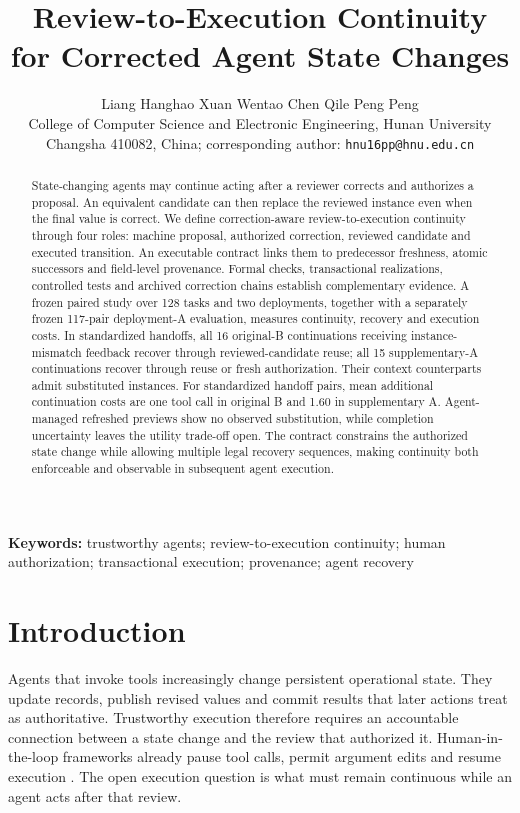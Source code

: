 \documentclass[10pt,a4paper,twocolumn]{article}
\title{Review-to-Execution Continuity for Corrected Agent State Changes}
\author{Liang Hanghao \quad Xuan Wentao \quad Chen Qile \quad Peng Peng\\
\small College of Computer Science and Electronic Engineering, Hunan University\\
\small Changsha 410082, China; corresponding author: \texttt{hnu16pp@hnu.edu.cn}}
\date{}
\begin{document}
\maketitle
\begin{abstract}
State-changing agents may continue acting after a reviewer corrects and authorizes a proposal. An equivalent candidate can then replace the reviewed instance even when the final value is correct. We define correction-aware review-to-execution continuity through four roles: machine proposal, authorized correction, reviewed candidate and executed transition. An executable contract links them to predecessor freshness, atomic successors and field-level provenance. Formal checks, transactional realizations, controlled tests and archived correction chains establish complementary evidence. A frozen paired study over 128 tasks and two deployments, together with a separately frozen 117-pair deployment-A evaluation, measures continuity, recovery and execution costs. In standardized handoffs, all 16 original-B continuations receiving instance-mismatch feedback recover through reviewed-candidate reuse; all 15 supplementary-A continuations recover through reuse or fresh authorization. Their context counterparts admit substituted instances. For standardized handoff pairs, mean additional continuation costs are one tool call in original B and 1.60 in supplementary A. Agent-managed refreshed previews show no observed substitution, while completion uncertainty leaves the utility trade-off open. The contract constrains the authorized state change while allowing multiple legal recovery sequences, making continuity both enforceable and observable in subsequent agent execution.
\end{abstract}
\noindent\textbf{Keywords:} trustworthy agents; review-to-execution continuity; human authorization; transactional execution; provenance; agent recovery

\section{Introduction}
Agents that invoke tools increasingly change persistent operational state. They update records, publish revised values and commit results that later actions treat as authoritative. Trustworthy execution therefore requires an accountable connection between a state change and the review that authorized it. Human-in-the-loop frameworks already pause tool calls, permit argument edits and resume execution \citep{langchainHITL}. The open execution question is what must remain continuous while an agent acts after that review.
\end{document}
